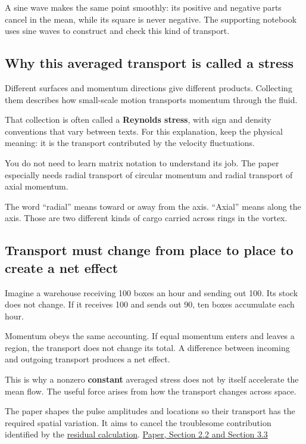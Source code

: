 \documentclass[
  english,
  11pt,
]{article}
\begin{document}
A sine wave makes the same point smoothly: its positive and negative
parts cancel in the mean, while its square is never negative. The
supporting notebook uses sine waves to construct and check this kind of
transport.

\subsection{Why this averaged transport is called a
stress}\label{why-this-averaged-transport-is-called-a-stress}

Different surfaces and momentum directions give different products.
Collecting them describes how small-scale motion transports momentum
through the fluid.

That collection is often called a \textbf{Reynolds stress}, with sign
and density conventions that vary between texts. For this explanation,
keep the physical meaning: it is the transport contributed by the
velocity fluctuations.

You do not need to learn matrix notation to understand its job. The
paper especially needs radial transport of circular momentum and radial
transport of axial momentum.

The word ``radial'' means toward or away from the axis. ``Axial'' means
along the axis. Those are two different kinds of cargo carried across
rings in the vortex.

\subsection{Transport must change from place to place to create a net
effect}\label{transport-must-change-from-place-to-place-to-create-a-net-effect}

Imagine a warehouse receiving 100 boxes an hour and sending out 100. Its
stock does not change. If it receives 100 and sends out 90, ten boxes
accumulate each hour.

Momentum obeys the same accounting. If equal momentum enters and leaves
a region, the transport does not change its total. A difference between
incoming and outgoing transport produces a net effect.

This is why a nonzero \textbf{constant} averaged stress does not by
itself accelerate the mean flow. The useful force arises from how the
transport changes across space.

The paper shapes the pulse amplitudes and locations so their transport
has the required spatial variation. It aims to cancel the troublesome
contribution identified by the
\href{../d3_residual/article.html}{residual calculation}.
\href{https://cdn.openai.com/pdf/32d9f210-8b73-45e0-91bc-82a30aef8a9a/navier-stokes.pdf}{Paper,
Section 2.2 and Section 3.3}
\end{document}
